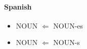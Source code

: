 \documentclass[a4paper,11pt]{article}
\begin{document}
\paragraph{Spanish}
\begin{itemize}
\itemsep-0.2em 
 \item NOUN $\Leftarrow$ NOUN-es
 \item NOUN $\Leftarrow$ NOUN-s
\end{itemize}





%
%


\end{document}
